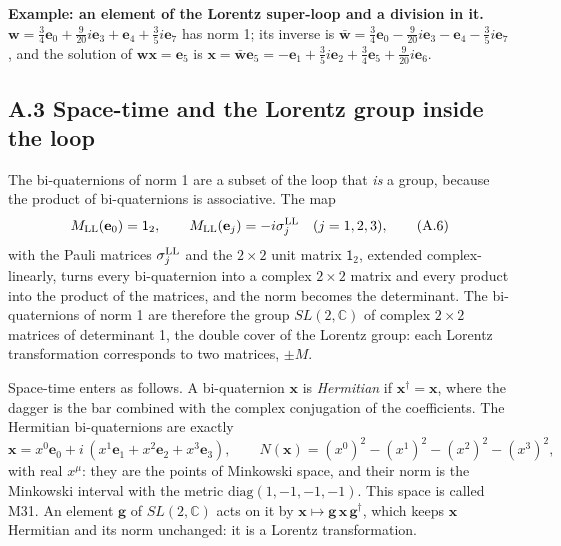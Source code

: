 \documentclass[
  10pt,
]{article}
\begin{document}
\textbf{Example: an element of the Lorentz super-loop and a division in
it.}
\(\mathbf w=\tfrac{3}{4}\mathbf e_{0}+\tfrac{9}{20}i\mathbf e_{3}+\mathbf e_{4}+\tfrac{3}{5}i\mathbf e_{7}\)
has norm 1; its inverse is
\(\bar{\mathbf w}=\tfrac{3}{4}\mathbf e_{0}-\tfrac{9}{20}i\mathbf e_{3}-\mathbf e_{4}-\tfrac{3}{5}i\mathbf e_{7}\),
and the solution of \(\mathbf w\mathbf x=\mathbf e_5\) is
\(\mathbf x=\bar{\mathbf w}\mathbf e_5=-\mathbf e_{1}+\tfrac{3}{5}i\mathbf e_{2}+\tfrac{3}{4}\mathbf e_{5}+\tfrac{9}{20}i\mathbf e_{6}\).

\hypertarget{a.3-space-time-and-the-lorentz-group-inside-the-loop}{%
\subsection{A.3 Space-time and the Lorentz group inside the
loop}\label{a.3-space-time-and-the-lorentz-group-inside-the-loop}}

The bi-quaternions of norm 1 are a subset of the loop that \emph{is} a
group, because the product of bi-quaternions is associative. The map
\[M_{\rm LL}(\mathbf e_0)=\mathsf 1_2,\qquad M_{\rm LL}(\mathbf e_j)=-i\sigma^{\rm LL}_j\quad(j=1,2,3),\tag{A.6}\]
with the Pauli matrices \(\sigma^{\rm LL}_j\) and the \(2\times2\) unit
matrix \(\mathsf 1_2\), extended complex-linearly, turns every
bi-quaternion into a complex \(2\times2\) matrix and every product into
the product of the matrices, and the norm becomes the determinant. The
bi-quaternions of norm 1 are therefore the group \(SL(2,\mathbb C)\) of
complex \(2\times2\) matrices of determinant 1, the double cover of the
Lorentz group: each Lorentz transformation corresponds to two matrices,
\(\pm M\).

Space-time enters as follows. A bi-quaternion \(\mathbf x\) is
\emph{Hermitian} if \(\mathbf x^\dagger=\mathbf x\), where the dagger is
the bar combined with the complex conjugation of the coefficients. The
Hermitian bi-quaternions are exactly
\[\mathbf x=x^0\mathbf e_0+i\,(x^1\mathbf e_1+x^2\mathbf e_2+x^3\mathbf e_3),\qquad N(\mathbf x)=(x^0)^2-(x^1)^2-(x^2)^2-(x^3)^2,\tag{A.7}\]
with real \(x^\mu\): they are the points of Minkowski space, and their
norm is the Minkowski interval with the metric
\(\mathrm{diag}(1,-1,-1,-1)\). This space is called M31. An element
\(\mathbf g\) of \(SL(2,\mathbb C)\) acts on it by
\(\mathbf x\mapsto\mathbf g\,\mathbf x\,\mathbf g^\dagger\), which keeps
\(\mathbf x\) Hermitian and its norm unchanged: it is a Lorentz
transformation.
\end{document}
